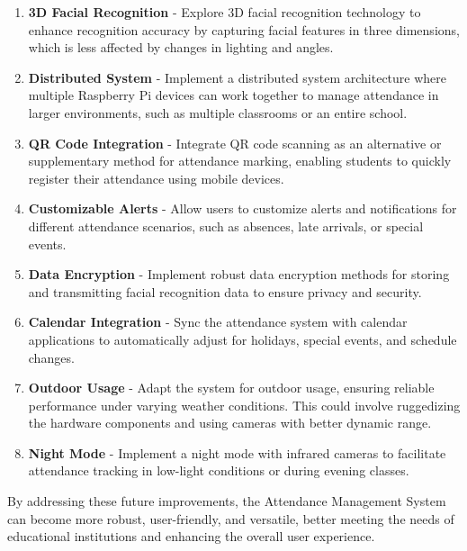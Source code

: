 \documentclass[12pt,a4paper]{report}
\begin{document}
\begin{enumerate}
	\item \textbf{3D Facial Recognition} - Explore 3D facial recognition technology to enhance recognition accuracy by capturing facial features in three dimensions, which is less affected by changes in lighting and angles.
	\item \textbf{Distributed System} - Implement a distributed system architecture where multiple Raspberry Pi devices can work together to manage attendance in larger environments, such as multiple classrooms or an entire school.
	\item \textbf{QR Code Integration} - Integrate QR code scanning as an alternative or supplementary method for attendance marking, enabling students to quickly register their attendance using mobile devices.
	\item \textbf{Customizable Alerts} - Allow users to customize alerts and notifications for different attendance scenarios, such as absences, late arrivals, or special events.
	\item \textbf{Data Encryption} - Implement robust data encryption methods for storing and transmitting facial recognition data to ensure privacy and security.
	\item \textbf{Calendar Integration} - Sync the attendance system with calendar applications to automatically adjust for holidays, special events, and schedule changes.
	\item \textbf{Outdoor Usage} - Adapt the system for outdoor usage, ensuring reliable performance under varying weather conditions. This could involve ruggedizing the hardware components and using cameras with better dynamic range.
	\item \textbf{Night Mode} - Implement a night mode with infrared cameras to facilitate attendance tracking in low-light conditions or during evening classes.
\end{enumerate}

\par By addressing these future improvements, the Attendance Management System can become more robust, user-friendly, and versatile, better meeting the needs of educational institutions and enhancing the overall user experience.

\newpage
\nocite{*}
\printbibliography[heading=bibintoc, title={References}]
\end{document}
